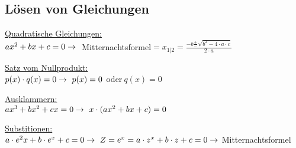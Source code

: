 \subsection{Lösen von Gleichungen}

\underline{Quadratische Gleichungen:} \\
$
ax^2 + bx + c = 0 \\
\rightarrow\ $ Mitternachtsformel$ 
= x_{1|2} = \frac{-b\frac{+}{-}\sqrt{b^2 - 4\cdot a\cdot c}}{2\cdot a}
$

\underline{Satz vom Nullprodukt:} \\
$
p(x)\cdot q(x) = 0 \\
\rightarrow\ p(x) = 0\ $oder$\ q(x) = 0
$

\underline{Ausklammern:} \\
$
ax^3 + bx^2 + cx = 0 \\
\rightarrow\ x\cdot (ax^2 + bx + c) = 0
$

\underline{Substitionen:} \\
$
a\cdot e^2x + b\cdot e^x + c = 0 \\
\rightarrow\ Z = e^x \\
= a\cdot z^x + b \cdot z + c = 0 \rightarrow\ $Mitternachtsformel$
$

